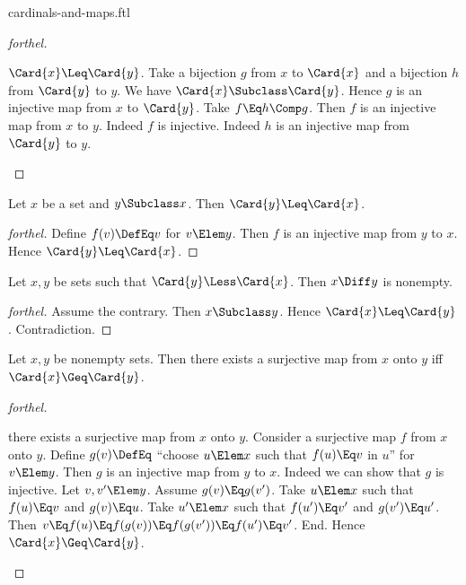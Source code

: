 \documentclass{stex}
\begin{document}
\begin{smodule}{cardinals-and-maps.ftl}
\begin{proof}[forthel]
  \begin{case}{$\Card{x} \Leq \Card{y}$.}
    Take a bijection $g$ from $x$ to $\Card{x}$ and a bijection $h$ from $\Card{y}$ to $y$.
    We have $\Card{x} \Subclass \Card{y}$.
    Hence $g$ is an injective map from $x$ to $\Card{y}$.
    Take $f \Eq h \Comp g$.
    Then $f$ is an injective map from $x$ to $y$.
    Indeed $f$ is injective.
    Indeed $h$ is an injective map from $\Card{y}$ to $y$.
  \end{case}
\end{proof}

\begin{proposition*}[forthel]
  Let $x$ be a set and $y \Subclass x$.
  Then $\Card{y} \Leq \Card{x}$.
\end{proposition*}
\begin{proof}[forthel]
  Define $f(v) \DefEq v$ for $v \Elem y$.
  Then $f$ is an injective map from $y$ to $x$.
  Hence $\Card{y} \Leq \Card{x}$.
\end{proof}

\begin{proposition*}[forthel]
  Let $x, y$ be sets such that $\Card{y} \Less \Card{x}$.
  Then $x \Diff y$ is nonempty.
\end{proposition*}
\begin{proof}[forthel]
  Assume the contrary.
  Then $x \Subclass y$.
  Hence $\Card{x} \Leq \Card{y}$.
  Contradiction.
\end{proof}

\begin{proposition*}[forthel,name=existence condition for surjections]
  Let $x, y$ be nonempty sets.
  Then there exists a surjective map from $x$ onto $y$ iff $\Card{x} \Geq \Card{y}$.
\end{proposition*}
\begin{proof}[forthel]
  \begin{case}{there exists a surjective map from $x$ onto $y$.}
    Consider a surjective map $f$ from $x$ onto $y$.
    Define $g(v) \DefEq$ ``choose $u \Elem x$ such that $f(u) \Eq v$ in $u$'' for $v \Elem y$.
    Then $g$ is an injective map from $y$ to $x$.
    Indeed we can show that $g$ is injective.
      Let $v, v' \Elem y$.
      Assume $g(v) \Eq g(v')$.
      Take $u \Elem x$ such that $f(u) \Eq v$ and $g(v) \Eq u$.
      Take $u' \Elem x$ such that $f(u') \Eq v'$ and $g(v') \Eq u'$.
      Then $v
        \Eq f(u)
        \Eq f(g(v))
        \Eq f(g(v'))
        \Eq f(u')
        \Eq v'$.
    End.
    Hence $\Card{x} \Geq \Card{y}$.
  \end{case}


\end{proof}
\end{smodule}
\end{document}

